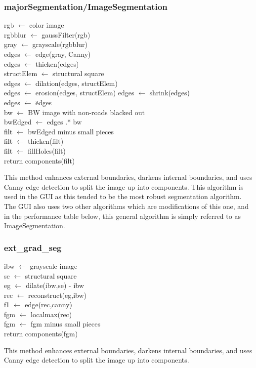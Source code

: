\documentclass[12pt]{article}
\begin{document}
\subsubsection*{majorSegmentation/ImageSegmentation}
\begin{addmargin}[12em]{1em}
	rgb $\leftarrow$ color image \\
	rgbblur $\leftarrow$ gaussFilter(rgb) \\
	gray $\leftarrow$ grayscale(rgbblur) \\
	edges $\leftarrow$ edge(gray, Canny)\\
	edges $\leftarrow$ thicken(edges)\\
	structElem $\leftarrow$ structural square\\
	edges $\leftarrow$ dilation(edges, structElem)\\
	edges $\leftarrow$ erosion(edges, structElem)
	edges $\leftarrow$ shrink(edges)\\
	edges $\leftarrow$ \~edges\\
	bw $\leftarrow$ BW image with non-roads blacked out\\
	bwEdged $\leftarrow$ edges .* bw\\
	filt $\leftarrow$ bwEdged minus small pieces\\
	filt $\leftarrow$ thicken(filt)\\
	filt $\leftarrow$ fillHoles(filt)\\
	
	return components(filt)\\
\end{addmargin}
This method enhances external boundaries, darkens internal boundaries, and uses Canny edge detection to split the image up into components. This algorithm is used in the GUI as this tended to be the most robust segmentation algorithm. The GUI also uses two other algorithms which are modifications of this one, and in the performance table below, this general algorithm is simply referred to as ImageSegmentation.

\subsubsection*{ext\_grad\_seg}
\begin{addmargin}[12em]{1em}
	ibw $\leftarrow$ grayscale image \\
	se $\leftarrow$ structural square \\
	eg $\leftarrow$ dilate(ibw,se) - ibw \\
	rec $\leftarrow$ reconstruct(eg,ibw) \\
	f1 $\leftarrow$ edge(rec,canny) \\
	fgm $\leftarrow$ localmax(rec) \\
	fgm $\leftarrow$ fgm minus small pieces \\
	return components(fgm) \\
\end{addmargin}
This method enhances external boundaries, darkens internal boundaries, and uses Canny edge detection to split the image up into components.
\end{document}
